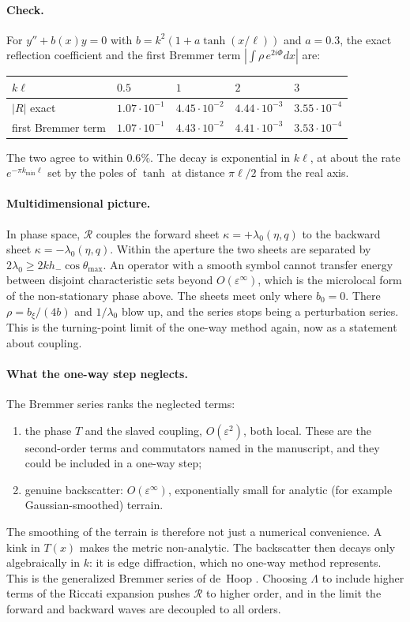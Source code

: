 \documentclass[11pt]{article}
\begin{document}
\paragraph{Check.} For $y''+b(x)y=0$ with $b=k^2(1+a\tanh(x/\ell))$ and
$a=0.3$, the exact reflection coefficient and the first Bremmer term
$\left|\int\rho\,e^{2i\Phi}dx\right|$ are:
\begin{center}
\begin{tabular}{@{}lllll@{}}
\toprule
$k\ell$ & $0.5$ & $1$ & $2$ & $3$ \\
\midrule
$|R|$ exact & $1.07\cdot10^{-1}$ & $4.45\cdot10^{-2}$ & $4.44\cdot10^{-3}$ & $3.55\cdot10^{-4}$ \\
first Bremmer term & $1.07\cdot10^{-1}$ & $4.43\cdot10^{-2}$ & $4.41\cdot10^{-3}$ & $3.53\cdot10^{-4}$ \\
\bottomrule
\end{tabular}
\end{center}
The two agree to within $0.6\%$. The decay is exponential in $k\ell$, at about
the rate $e^{-\pi k_{\min}\ell}$ set by the poles of $\tanh$ at distance
$\pi\ell/2$ from the real axis.

\paragraph{Multidimensional picture.} In phase space, $\mathcal R$ couples the
forward sheet $\kappa=+\lambda_0(\eta,q)$ to the backward sheet
$\kappa=-\lambda_0(\eta,q)$. Within the aperture the two sheets are separated
by $2\lambda_0\ge2kh_-\cos\theta_{\max}$. An operator with a smooth symbol
cannot transfer energy between disjoint characteristic sets beyond
$O(\varepsilon^\infty)$, which is the microlocal form of the non-stationary
phase above. The sheets meet only where $b_0=0$. There $\rho=b_\xi/(4b)$ and
$1/\lambda_0$ blow up, and the series stops being a perturbation series. This
is the turning-point limit of the one-way method again, now as a statement
about coupling.

\paragraph{What the one-way step neglects.} The Bremmer series ranks the
neglected terms:
\begin{enumerate}
\item the phase $T$ and the slaved coupling, $O(\varepsilon^2)$, both local.
  These are the second-order terms and commutators named in the manuscript,
  and they could be included in a one-way step;
\item genuine backscatter: $O(\varepsilon^\infty)$, exponentially small for
  analytic (for example Gaussian-smoothed) terrain.
\end{enumerate}
The smoothing of the terrain is therefore not just a numerical convenience. A
kink in $T(x)$ makes the metric non-analytic. The backscatter then decays
only algebraically in $k$: it is edge diffraction, which no one-way method
represents. This is the generalized Bremmer series of de~Hoop
\cite{dehoop}. Choosing $\Lambda$ to include higher terms of the Riccati
expansion pushes $\mathcal R$ to higher order, and in the limit the forward
and backward waves are decoupled to all orders.
\end{document}
